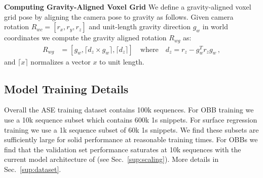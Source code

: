 \noindent\textbf{Computing Gravity-Aligned Voxel Grid}
%
We define a gravity-aligned voxel grid pose by aligning the camera pose to gravity as follows.
Given camera rotation $R_{wc} = [r_x, r_y, r_z]$ and unit-length gravity direction $g_w$ in world coordinates we compute the gravity aligned rotation $R_{wg}$ as:
\begin{align}
    R_{wg} &= [g_w, \lceil d_z \times g_w \rceil, \lceil d_z\rceil ] \quad \text{where}\quad
     d_z %
     = r_z - g_w^T r_z g_w \,,
\end{align}
and $\lceil x \rceil $ normalizes a vector $x$ to unit length.

\subsection{Model Training Details}



Overall the ASE training dataset contains 100k sequences. 
For OBB training we use a 10k sequence subset which contains 600k 1s snippets. 
For surface regression training we use a 1k sequence subset of 60k 1s snippets. We find these subsets are sufficiently large for solid performance at reasonable training times. For OBBs we find that the validation set performance saturates at 10k sequences with the current model architecture of \EVL{} (see Sec.~\ref{sup:scaling}). More details in Sec.~\ref{sup:dataset}.

